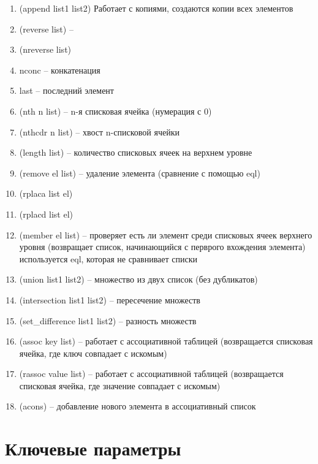 \begin{enumerate}
    \item {\ttfamily (append list1 list2)}
        Работает с копиями, создаются копии всех элементов
    \item {\ttfamily (reverse list)} --
    \item {\ttfamily (nreverse list)}
    \item {\ttfamily nconc} --
        конкатенация
    \item {\ttfamily last} --
        последний элемент
    \item {\ttfamily (nth n list)} --
        n-я списковая ячейка (нумерация с 0)
    \item {\ttfamily (nthcdr n list)} --
        хвост n-списковой ячейки
    \item {\ttfamily (length list)} --
        количество списковых ячеек на верхнем уровне
    \item {\ttfamily (remove el list)} --
        удаление элемента (сравнение с помощью {\ttfamily eql})
    \item {\ttfamily (rplaca list el)}
    \item {\ttfamily (rplacd list el)}
    \item {\ttfamily (member el list)} --
        проверяет есть ли элемент среди списковых ячеек верхнего уровня
        (возвращает список, начинающийся с перврого вхождения элемента)
        используется {\ttfamily eql}, которая не сравнивает списки
    \item {\ttfamily (union list1 list2)} --
        множество из двух список (без дубликатов)
    \item {\ttfamily (intersection list1 list2)} --
        пересечение множеств
    \item {\ttfamily (set\_difference list1 list2)} --
        разность множеств
    \item {\ttfamily (assoc key list)} --
        работает с ассоциативной таблицей
        (возвращается списковая ячейка, где ключ совпадает с искомым)
    \item {\ttfamily (rassoc value list)} --
        работает с ассоциативной таблицей
        (возвращается списковая ячейка,
        где значение совпадает с искомым)
    \item {\ttfamily (acons)} --
        добавление нового элемента в ассоциативный список
\end{enumerate}

\section{Ключевые параметры}

